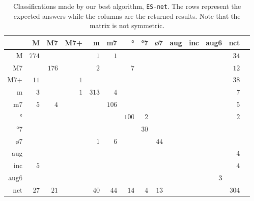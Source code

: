 \documentclass{article}
\begin{document}
\begin{table*}
\centering
\begin{tabular}{r||r|r|r|r|r|r|r|r|r|r|r|r|r}
      &     M &    M7 &   M7+ &     m &    m7 &    ° &   °7 &   ø7 &   aug &   inc &  aug6 &   nct \\  \hline \hline
    M & $ 774 $ & $     $ & $     $ & $   1 $ & $   1 $ & $     $ & $     $ & $     $ & $     $ & $     $ & $     $ & $  34 $ \\ \hline
   M7 & $     $ & $ 176 $ & $     $ & $   2 $ & $     $ & $   7 $ & $     $ & $     $ & $     $ & $     $ & $     $ & $  12 $ \\ \hline
  M7+ & $  11 $ & $     $ & $   1 $ & $     $ & $     $ & $     $ & $     $ & $     $ & $     $ & $     $ & $     $ & $  38 $ \\ \hline
    m & $   3 $ & $     $ & $   1 $ & $ 313 $ & $   4 $ & $     $ & $     $ & $     $ & $     $ & $     $ & $     $ & $   7 $ \\ \hline
   m7 & $   5 $ & $   4 $ & $     $ & $     $ & $ 106 $ & $     $ & $     $ & $     $ & $     $ & $     $ & $     $ & $   5 $ \\ \hline
   ° & $     $ & $     $ & $     $ & $     $ & $     $ & $ 100 $ & $   2 $ & $     $ & $     $ & $     $ & $     $ & $   2 $ \\ \hline
  °7 & $     $ & $     $ & $     $ & $     $ & $     $ & $     $ & $  30 $ & $     $ & $     $ & $     $ & $     $ & $     $ \\ \hline
  ø7 & $     $ & $     $ & $     $ & $   1 $ & $   6 $ & $     $ & $     $ & $  44 $ & $     $ & $     $ & $     $ & $     $ \\ \hline
  aug & $     $ & $     $ & $     $ & $     $ & $     $ & $     $ & $     $ & $     $ & $     $ & $     $ & $     $ & $   4 $ \\ \hline
  inc & $   5 $ & $     $ & $     $ & $     $ & $     $ & $     $ & $     $ & $     $ & $     $ & $     $ & $     $ & $   4 $ \\ \hline
 aug6 & $     $ & $     $ & $     $ & $     $ & $     $ & $     $ & $     $ & $     $ & $     $ & $     $ & $   3 $ & $     $ \\ \hline
  nct & $  27 $ & $  21 $ & $     $ & $  40 $ & $  44 $ & $  14 $ & $   4 $ & $  13 $ & $     $ & $     $ & $     $ & $ 304 $ \\ \hline
\end{tabular}
\caption{Classifications made by our best algorithm, \texttt{ES-net}. The rows represent
  the expected answers while the columns are the returned
  results. Note that the matrix is not symmetric.}
\label{tab:erros-ES-net}
\end{table*}
\end{document}

